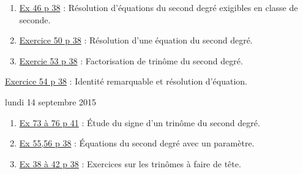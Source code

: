 \documentclass[a4paper,11pt]{article}
\theoremstyle{break}
\begin{document}
  
  \begin{enumerate}   
    \item  
    \href{https://github.com/mathlorgues/math1sd1516/blob/master/images/46p38.jpg}
    {Ex 46 p 38} : Résolution d'équations du second degré exigibles en classe de seconde.
    
    \item 
    \href{https://github.com/mathlorgues/math1sd1516/blob/master/20150907/46p38.jpg}
    {Exercice 50 p 38} : Résolution d'une équation du second degré.
    \item 
    \href{https://github.com/mathlorgues/math1sd1516/blob/master/images/53-54p38.png}
    {Exercie 53 p 38} : Factorisation de trinôme du second degré.
    
  \end{enumerate}
  
  \begin{Dev}  
    \href{https://github.com/mathlorgues/math1sd1516/blob/master/images/53-54p38.png}
    {Exercice 54 p 38} : Identité remarquable et résolution d'équation.
  \end{Dev}
  
  lundi 14 septembre 2015
  
  \begin{enumerate}
    
    \item
    \href{https://github.com/mathlorgues/math1sd1516/blob/master/images/73-76p41.png}
    {Ex 73 à 76 p 41} : \'Etude du signe d'un trinôme du second degré.
    
    \item 
    \href{https://github.com/mathlorgues/math1sd1516/blob/master/images/55-56p38.png}
    {Ex 55,56 p 38} : \'Equations du second degré avec un paramètre.
    
    \item
    \href{https://github.com/mathlorgues/math1sd1516/blob/master/20150907/38-42p38.jpg}
    {Ex 38 à 42 p 38} : Exercices sur les trinômes à faire de tête.
    
  \end{enumerate}
  
\end{document}
